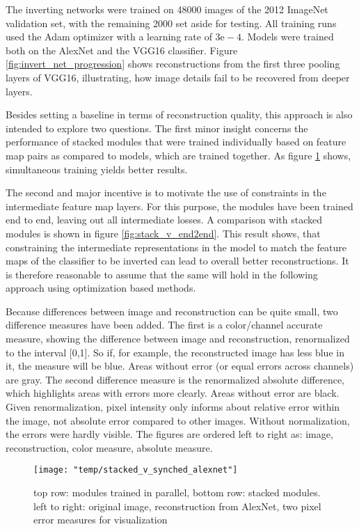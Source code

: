 \documentclass{article}
\begin{document}
The inverting networks were trained on 48000 images of the 2012 ImageNet validation set, with the remaining 2000 set aside for testing. All training runs used the Adam optimizer \cite{adam} with a learning rate of $3\mathrm{e-}4$. Models were trained both on the AlexNet and the VGG16 classifier.  Figure \ref{fig:invert_net_progression} shows reconstructions from the first three pooling layers of VGG16, illustrating, how image details fail to be recovered from deeper layers.

Besides setting a baseline in terms of reconstruction quality, this approach is also intended to explore two questions. The first minor insight concerns the performance of stacked modules that were trained individually based on feature map pairs as compared to models, which are trained together. As figure \ref{fig:stack_v_sync} shows, simultaneous training yields better results. 

The second and major incentive is to motivate the use of constraints in the intermediate feature map layers. For this purpose, the modules have been trained end to end, leaving out all intermediate losses. A comparison with stacked modules is shown in figure \ref{fig:stack_v_end2end}. This result shows, that constraining the intermediate representations in the model to match the feature maps of the classifier to be inverted can lead to overall better reconstructions. It is therefore reasonable to assume that the same will hold in the following approach using optimization based methods.

Because differences between image and reconstruction can be quite small, two difference measures have been added. The first is a color/channel accurate measure, showing the difference between image and reconstruction, renormalized to the interval [0,1]. So if, for example, the reconstructed image has less blue in it, the measure will be blue. Areas without error (or equal errors across channels) are gray. The second difference measure is the renormalized absolute difference, which highlights areas with errors more clearly. Areas without error are black. Given renormalization,  pixel intensity only informs about relative error within the image, not absolute error compared to other images. Without normalization, the errors were hardly visible. The figures are ordered left to right as: image, reconstruction, color measure, absolute measure. 



\begin{figure}
	\centering
	\texttt{[image: "temp/stacked\_v\_synched\_alexnet"]}
	\caption{top row: modules trained in parallel, bottom row: stacked modules.
		left to right: original image, reconstruction from AlexNet, two pixel error measures for visualization}
	\label{fig:stack_v_sync}
\end{figure}
\end{document}
